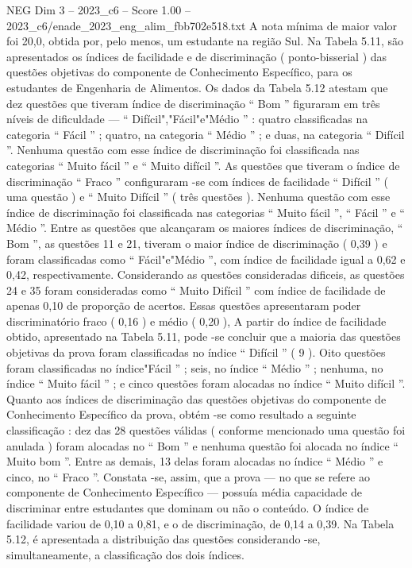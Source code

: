\begin{textsample}{NEG Dim 3 – 2023\_c6 – Score 1.00 – 2023\_c6/enade\_2023\_eng\_alim\_fbb702e518.txt}
A nota mínima de maior valor foi 20,0, obtida por, pelo menos, um estudante na região Sul.
Na Tabela 5.11, são apresentados os índices de facilidade e de discriminação ( ponto-bisserial ) das questões objetivas do componente de Conhecimento Específico, para os estudantes de Engenharia de Alimentos.
Os dados da Tabela 5.12 atestam que dez questões que tiveram índice de discriminação “ Bom ” figuraram em três níveis de dificuldade — “ Difícil","Fácil"e"Médio ” : quatro classificadas na categoria “ Fácil ” ; quatro, na categoria “ Médio ” ; e duas, na categoria “ Difícil ”.
Nenhuma questão com esse índice de discriminação foi classificada nas categorias “ Muito fácil ” e “ Muito difícil ”.
As questões que tiveram o índice de discriminação “ Fraco ” configuraram -se com índices de facilidade “ Difícil ” ( uma questão ) e “ Muito Difícil ” ( três questões ).
Nenhuma questão com esse índice de discriminação foi classificada nas categorias “ Muito fácil ”, “ Fácil ” e “ Médio ”.
Entre as questões que alcançaram os maiores índices de discriminação, “ Bom ”, as questões 11 e 21, tiveram o maior índice de discriminação ( 0,39 ) e foram classificadas como “ Fácil"e"Médio ”, com índice de facilidade igual a 0,62 e 0,42, respectivamente.
Considerando as questões consideradas dificeis, as questões 24 e 35 foram consideradas como “ Muito Difícil ” com índice de facilidade de apenas 0,10 de proporção de acertos.
Essas questões apresentaram poder discriminatório fraco ( 0,16 ) e médio ( 0,20 ), A partir do índice de facilidade obtido, apresentado na Tabela 5.11, pode -se concluir que a maioria das questões objetivas da prova foram classificadas no índice “ Difícil ” ( 9 ).
Oito questões foram classificadas no índice"Fácil ” ; seis, no índice “ Médio ” ; nenhuma, no índice “ Muito fácil ” ; e cinco questões foram alocadas no índice “ Muito difícil ”.
Quanto aos índices de discriminação das questões objetivas do componente de Conhecimento Específico da prova, obtém -se como resultado a seguinte classificação : dez das 28 questões válidas ( conforme mencionado uma questão foi anulada ) foram alocadas no “ Bom ” e nenhuma questão foi alocada no índice “ Muito bom ”.
Entre as demais, 13 delas foram alocadas no índice “ Médio ” e cinco, no “ Fraco ”.
Constata -se, assim, que a prova — no que se refere ao componente de Conhecimento Específico — possuía média capacidade de discriminar entre estudantes que dominam ou não o conteúdo.
O índice de facilidade variou de 0,10 a 0,81, e o de discriminação, de 0,14 a 0,39.
Na Tabela 5.12, é apresentada a distribuição das questões considerando -se, simultaneamente, a classificação dos dois índices.

\end{textsample}
